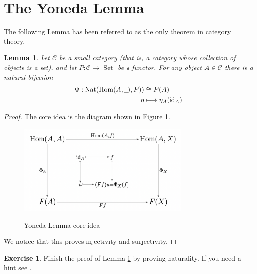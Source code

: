 \documentclass[12pt]{article}
\theoremstyle{plain}
\newtheorem{lemma}[thm]{Lemma}
\theoremstyle{definition}
\newtheorem{exercise}[thm]{Exercise}
\newcommand{\scr}[1]{\mathscr{#1}}
\newcommand{\und}[1]{\underline{\hspace{#1 cm}}}
\newcommand{\lto}{\longrightarrow}
\begin{document}
\section{The Yoneda Lemma}
The following Lemma has been referred to as the only theorem in category theory.
\begin{lemma}\label{lem:Yoneda}
	Let $\scr{C}$ be a small category (that is, a category whose collection of objects is a set), and let $P: \scr{C} \lto \underline{\operatorname{Set}}$ be a functor. For any object $A \in \scr{C}$ there is a natural bijection
	\begin{align*}
		\Phi: \operatorname{Nat}(\operatorname{Hom}(A, \und{0.2}), P)) &\cong P(A)\\
		\eta &\longmapsto \eta_{A}(\operatorname{id}_A)
		\end{align*}
	\end{lemma}
\begin{proof}
	The core idea is the diagram shown in Figure \ref{fig:yoneda}.
	\begin{figure}
		\begin{center}
		\caption{Yoneda Lemma core idea}
		\includegraphics[width=0.75\textwidth]{Yoneda.png}\label{fig:yoneda}
	\end{center}
		\end{figure}
	We notice that this proves injectivity and surjectivity.
	\end{proof}
\begin{exercise}
	Finish the proof of Lemma \ref{lem:Yoneda} by proving naturality. If you need a hint see \cite{Yoneda}.
	\end{exercise}
\end{document}
